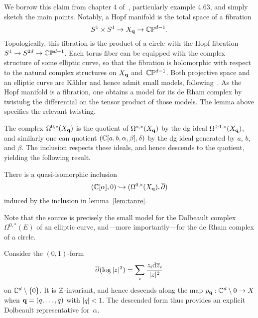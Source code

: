 We borrow this claim from chapter 4 of~\cite{Tanre}, particularly example 4.63,
and simply sketch the main points.
Notably, a Hopf manifold is the total space of a fibration
\[
S^1 \times S^1 \to X_{\bf q} \to \mathbb C\mathbb P^{d-1}.
\]
Topologically, this fibration is the product of a circle with the Hopf fibration $S^1 \to S^{2d} \to \mathbb C\mathbb P^{d-1}$. 
Each torus fiber can be equipped with the complex structure of some elliptic curve, so that the fibration is holomorphic with respect to the natural complex structures on $X_{\bf q}$ and~$\mathbb C\mathbb P^{d-1}$.
Both projective space and an elliptic curve are K\"ahler and hence admit small models, 
following~\cite{DGMS}.
As the Hopf manifold is a fibration, one obtains a model for its de Rham complex by twistubg the differential on the tensor product of those models.
The lemma above specifies the relevant twisting.

The complex $\Omega^{0, *}(X_{\bf q})$ is the quotient of $\Omega^{*, *}(X_{\bf q})$ by the dg ideal $\Omega^{\geq 1, *}(X_{\bf q})$,
and similarly one can quotient $(\mathbb C[a, b, \alpha, \beta], \delta)$ by the dg ideal generated by $a$, $b$, and $\beta$. 
The inclusion respects these ideals, and hence descends to the quotient, yielding the following result.

\begin{lem}
There is a quasi-isomorphic inclusion 
\[
(\mathbb C[\alpha], 0) \hookrightarrow (\Omega^{0,*}(X_{\bf q}), \overline{\partial})
\]
induced by the inclusion in lemma~\ref{lem:tanre}.
\end{lem}

Note that the source is precisely the small model for the Dolbeault complex $\Omega^{0, *}(E)$ of an elliptic curve,
and---more importantly---for the de Rham complex of a circle.

\begin{eg}
Consider 
the $(0,1)$-form 
\[
\overline{\partial} (\log |z|^2) = \sum_i \frac{z_i{\rm d} \overline{z}_i}{|z|^2} 
\]
on $\mathbb C^d \setminus \{0\}$.
It is $\mathbb Z$-invariant, and hence descends along the map $p_{\bf q} : \mathbb C^d \setminus 0 \to X$
when ${\bf q} = (q,\ldots,q)$ with $|q| < 1$.
The descended form thus provides an explicit Dolbeault representative for~$\alpha$.
\end{eg}



